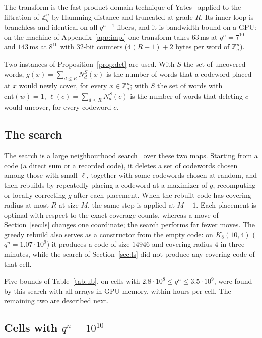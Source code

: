 \documentclass[11pt]{amsart}
\newcommand{\Kq}[3]{K_{#1}(#2,#3)}
\newcommand{\Zq}{\mathbb{Z}_q}
\begin{document}
The transform is the fast product-domain technique of Yates~\cite{Yates}
applied to the filtration of $\Zq^n$ by Hamming distance and truncated at
grade $R$. Its inner loop is branchless and identical on all $q^{n-1}$
fibers, and it is bandwidth-bound on a GPU: on the machine of
Appendix~\ref{app:impl} one transform takes $63$\,ms at $q^n=7^{10}$ and
$143$\,ms at $8^{10}$ with $32$-bit counters ($4(R+1)+2$ bytes per word of
$\Zq^n$).

Two instances of Proposition~\ref{prop:dct} are used. With $S$ the set of
uncovered words, $g(x)=\sum_{d\le R}N_d^S(x)$ is the number of words that
a codeword placed at $x$ would newly cover, for every $x\in\Zq^n$; with $S$
the set of words with $\mathrm{cnt}(w)=1$, $\ell(c)=\sum_{d\le R}N_d^S(c)$
is the number of words that deleting $c$ would uncover, for every codeword
$c$.

\subsection{The search}

The search is a large neighbourhood search~\cite{Shaw1998} over these two
maps. Starting from a code (a direct sum or a recorded code), it deletes a
set of codewords chosen among those with small $\ell$, together with some
codewords chosen at random, and then rebuilds by repeatedly placing a
codeword at a maximizer of $g$, recomputing or locally correcting $g$
after each placement. When the rebuilt code has covering radius at most
$R$ at size $M$, the same step is applied at $M-1$. Each placement is
optimal with respect to the exact coverage counts, whereas a move of
Section~\ref{sec:ls} changes one coordinate; the search performs far fewer
moves. The greedy rebuild also serves as a constructor from the empty code:
on $\Kq{8}{10}{4}$ ($q^n=1.07\cdot 10^9$) it produces a code of size
$14946$ and covering radius $4$ in three minutes, while the search of
Section~\ref{sec:ls} did not produce any covering code of that cell.

Five bounds of Table~\ref{tab:ub}, on cells with $2.8\cdot 10^8\le q^n\le
3.5\cdot 10^9$, were found by this search with all arrays in GPU memory,
within hours per cell. The remaining two are described next.

\subsection{Cells with $q^n=10^{10}$}\label{sec:lns:large}
\end{document}
